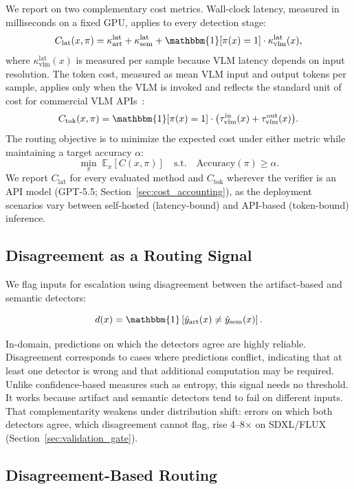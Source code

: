 \documentclass{ieeeaccess}
\begin{document}
We report on two complementary cost metrics. Wall-clock latency, measured in milliseconds on a fixed GPU, applies to every detection stage:
\[
C_{\text{lat}}(x, \pi) = \kappa^{\text{lat}}_{\text{art}} + \kappa^{\text{lat}}_{\text{sem}}
+ \mathbbm{1}[\pi(x)=1] \cdot \kappa^{\text{lat}}_{\text{vlm}}(x),
\]
where $\kappa^{\text{lat}}_{\text{vlm}}(x)$ is measured per sample because VLM latency depends on input resolution. The token cost, measured as mean VLM input and output tokens per sample, applies only when the VLM is invoked and reflects the standard unit of cost for commercial VLM APIs~\cite{chen2024frugalgpt}:
\[
C_{\text{tok}}(x, \pi) = \mathbbm{1}[\pi(x)=1] \cdot \bigl(\tau^{\text{in}}_{\text{vlm}}(x)
+ \tau^{\text{out}}_{\text{vlm}}(x)\bigr).
\]
The routing objective is to minimize the expected cost under either metric while maintaining a target accuracy $\alpha$:
\[
\min_{\pi} \; \mathbb{E}_x[C(x, \pi)] \quad \text{s.t.} \quad \text{Accuracy}(\pi) \geq \alpha.
\]
We report $C_{\text{lat}}$ for every evaluated method and $C_{\text{tok}}$ wherever the verifier is an API model (GPT-5.5; Section~\ref{sec:cost_accounting}), as the deployment scenarios vary between self-hosted (latency-bound) and API-based (token-bound) inference.

\subsection{Disagreement as a Routing Signal}

We flag inputs for escalation using disagreement between the artifact-based and semantic detectors:

\begin{equation}
d(x) = \mathbbm{1}\left[\hat{y}_{\text{art}}(x) \neq \hat{y}_{\text{sem}}(x)\right].
\label{eq:disagree}
\end{equation}

In-domain, predictions on which the detectors agree are highly reliable. Disagreement
corresponds to cases where predictions conflict, indicating that at least one detector
is wrong and that additional computation may be required. Unlike confidence-based
measures such as entropy, this signal needs no threshold. It works because artifact and
semantic detectors tend to fail on different inputs. That complementarity weakens under
distribution shift: errors on which both detectors agree, which disagreement cannot
flag, rise 4--8$\times$ on SDXL/FLUX (Section~\ref{sec:validation_gate}).

\subsection{Disagreement-Based Routing}
\end{document}
